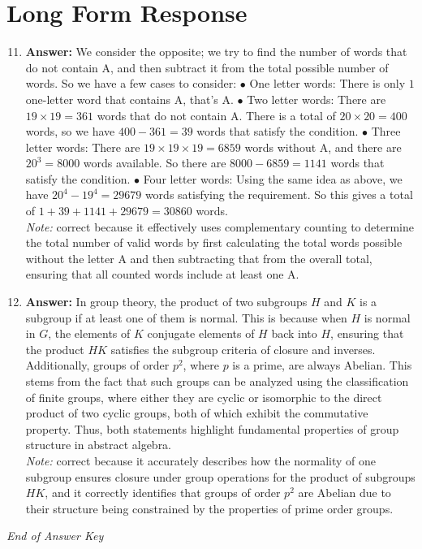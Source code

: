 \documentclass[12pt]{article}
\begin{document}
\section*{Long Form Response}
\begin{enumerate}[label=\arabic*.]
\setcounter{enumi}{10}
\item \textbf{Answer:} We consider the opposite; we try to find the number of words that do not contain A, and then subtract it from the total possible number of words. So we have a few cases to consider: $\bullet$ One letter words: There is only $1$ one-letter word that contains A, that's A. $\bullet$ Two letter words: There are $19\times 19=361$ words that do not contain A. There is a total of $20\times 20=400$ words, so we have $400-361=39$ words that satisfy the condition. $\bullet$ Three letter words: There are $19\times 19\times 19=6859$ words without A, and there are $20^{3}=8000$ words available. So there are $8000-6859=1141$ words that satisfy the condition. $\bullet$ Four letter words: Using the same idea as above, we have $20^{4}-19^{4}=29679$ words satisfying the requirement. So this gives a total of $1+39+1141+29679=\boxed{30860}$ words.
\\ \textit{Note:} correct because it effectively uses complementary counting to determine the total number of valid words by first calculating the total words possible without the letter A and then subtracting that from the overall total, ensuring that all counted words include at least one A.
\item \textbf{Answer:} In group theory, the product of two subgroups \( H \) and \( K \) is a subgroup if at least one of them is normal. This is because when \( H \) is normal in \( G \), the elements of \( K \) conjugate elements of \( H \) back into \( H \), ensuring that the product \( HK \) satisfies the subgroup criteria of closure and inverses. Additionally, groups of order \( p^2 \), where \( p \) is a prime, are always Abelian. This stems from the fact that such groups can be analyzed using the classification of finite groups, where either they are cyclic or isomorphic to the direct product of two cyclic groups, both of which exhibit the commutative property. Thus, both statements highlight fundamental properties of group structure in abstract algebra.
\\ \textit{Note:} correct because it accurately describes how the normality of one subgroup ensures closure under group operations for the product of subgroups \( HK \), and it correctly identifies that groups of order \( p^2 \) are Abelian due to their structure being constrained by the properties of prime order groups.
\end{enumerate}

\vfill
\noindent\textit{End of Answer Key}
\end{document}
